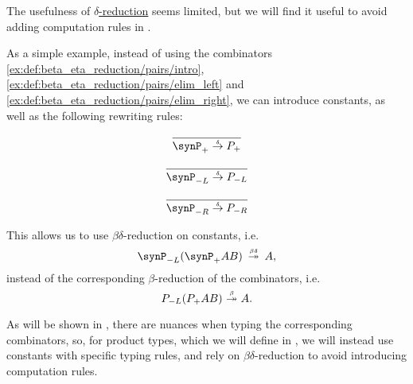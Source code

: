\begin{remark}\label{rem:delta_reduction}
  The usefulness of \hyperref[def:delta_reduction]{\( \delta \)-reduction} seems limited, but we will find it useful to avoid adding computation rules in .

  As a simple example, instead of using the combinators \ref{ex:def:beta_eta_reduction/pairs/intro}, \ref{ex:def:beta_eta_reduction/pairs/elim_left} and \ref{ex:def:beta_eta_reduction/pairs/elim_right}, we can introduce constants, as well as the following rewriting rules:
  \begin{paracol}{3}
    \begin{nthcolumn}{0}
      \begin{equation*}
        \begin{prooftree}
          \infer0{ \synP_+ \dred P_+ }
        \end{prooftree}
      \end{equation*}
    \end{nthcolumn}

    \begin{nthcolumn}{1}
      \begin{equation*}
        \begin{prooftree}
          \infer0{ \synP_{-L} \dred P_{-L} }
        \end{prooftree}
      \end{equation*}
    \end{nthcolumn}

    \begin{nthcolumn}{2}
      \begin{equation*}
        \begin{prooftree}
          \infer0{ \synP_{-R} \dred P_{-R} }
        \end{prooftree}
      \end{equation*}
    \end{nthcolumn}
  \end{paracol}

  This allows us to use \( \beta\delta \)-reduction on constants, i.e.
  \begin{equation*}
    \synP_{-L} (\synP_+ A B) \redrel*{\beta\delta} A,
  \end{equation*}
  instead of the corresponding \( \beta \)-reduction of the combinators, i.e.
  \begin{equation*}
    P_{-L} (P_+ A B) \bred* A.
  \end{equation*}

  As will be shown in , there are nuances when typing the corresponding combinators, so, for product types, which we will define in , we will instead use constants with specific typing rules, and rely on \( \beta\delta \)-reduction to avoid introducing computation rules.
\end{remark}


